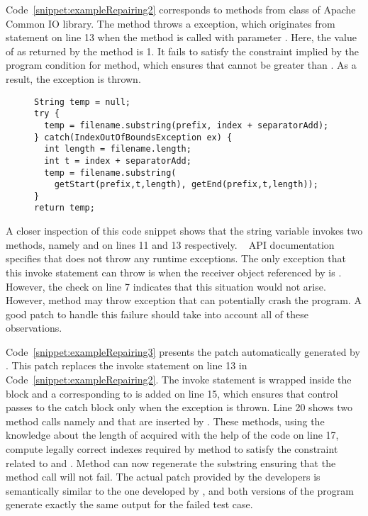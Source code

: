 Code~\ref{snippet:exampleRepairing2} corresponds to methods from
 class of Apache Common IO library. The method
 throws a  exception,
which originates from statement  on line 13 when the method is called with parameter
.  Here, the value of  as returned by the method
 is 1. It fails to satisfy the constraint implied by the
program condition  for 
method, which ensures that  cannot be greater than
. As a result, the exception is thrown.


\begin{figure}[t]
\centering
\begin{lstlisting}
String temp = null;
try {
  temp = filename.substring(prefix, index + separatorAdd);
} catch(IndexOutOfBoundsException ex) {
  int length = filename.length;
  int t = index + separatorAdd;
  temp = filename.substring(
    getStart(prefix,t,length), getEnd(prefix,t,length));
}
return temp;
\end{lstlisting}
\end{figure}

A closer inspection of this code snippet shows that the string variable
 invokes two methods, namely  and 
on lines 11 and 13 respectively. \java\  API documentation
specifies that  does not throw any runtime exceptions. The only
exception that this invoke statement can throw is when the receiver object
referenced by  is . However, the check on line 7
indicates that this situation would not arise. However, method 
may throw  exception that can potentially crash
the program. A good patch to handle this failure should take into account all of
these observations. 

Code~\ref{snippet:exampleRepairing3} presents the patch automatically generated
by \tool . This patch replaces the invoke statement on line 13 in
Code~\ref{snippet:exampleRepairing2}. The invoke statement is wrapped inside
the  block and a  corresponding to
 is added on line 15, which ensures that control
passes to the catch block only when the exception is thrown. Line 20 shows two
method calls namely  and  that are inserted by
\tool. These methods, using the knowledge about the length of 
acquired with the help of the code on line 17, compute legally correct indexes
required by  method to satisfy the constraint related to
 and . Method  can now
regenerate the substring ensuring that the method call will not fail. The actual
patch provided by the developers is semantically similar to the one developed by
\tool{}, and both versions of the program generate exactly the same output for
the failed test case.

